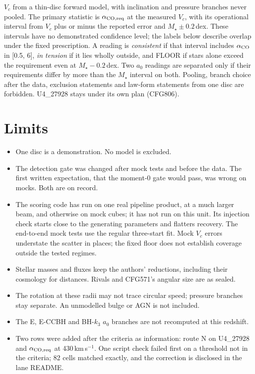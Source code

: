\documentclass[10pt]{article}
\begin{document}
 $V_c$ from a thin-disc forward model, with inclination and pressure branches never pooled. The primary statistic is $\alpha_{\rm CO,req}$ at the measured $V_c$, with its operational interval from $V_c$ plus or minus the reported error and $M_\star\pm0.2$\,dex. These intervals have no demonstrated confidence level; the labels below describe overlap under the fixed prescription. A reading is \emph{consistent} if that interval includes $\alpha_{\rm CO}$ in [0.5, 6], \emph{in tension} if it lies wholly outside, and FLOOR if stars alone exceed the requirement even at $M_\star-0.2$\,dex. Two $a_0$ readings are separated only if their requirements differ by more than the $M_\star$ interval on both. Pooling, branch choice after the data, exclusion statements and law-form statements from one disc are forbidden. U4\_27928 stays under its own plan (CFG806).



\section{Limits}
\begin{itemize}
\item One disc is a demonstration. No model is excluded.
\item The detection gate was changed after mock tests and before the data. The first written expectation, that the moment-0 gate would pass, was wrong on mocks. Both are on record.
\item The scoring code has run on one real pipeline product, at a much larger beam, and otherwise on mock cubes; it has not run on this unit. Its injection check starts close to the generating parameters and flatters recovery. The end-to-end mock tests use the regular three-start fit. Mock $V_c$ errors understate the scatter in places; the fixed floor does not establish coverage outside the tested regimes.
\item Stellar masses and fluxes keep the authors' reductions, including their cosmology for distances. Rivals and CFG571's angular size are as sealed.
\item The rotation at these radii may not trace circular speed; pressure branches stay separate. An unmodelled bulge or AGN is not included.
\item The E, E-CCBH and BH-$k_3$ $a_0$ branches are not recomputed at this redshift.
\item Two rows were added after the criteria as information: route N on U4\_27928 and $\alpha_{\rm CO,req}$ at 430\,km\,s$^{-1}$. One script check failed first on a threshold not in the criteria; 82 cells matched exactly, and the correction is disclosed in the lane README.
\end{itemize}
\end{document}
